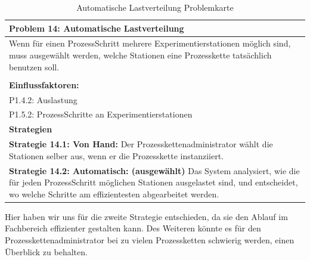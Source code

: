 \documentclass[enabledeprecatedfontcommands,fontsize=12pt,paper=a4,twoside]{scrartcl}
\begin{document}
\begin{table}[H]
    \centering
    \begin{tabular}{|p{15cm}|}
    \hline
          \textbf{Problem 14:} Automatische Lastverteilung
          \\ \hline
         Wenn für einen ProzessSchritt mehrere Experimentierstationen möglich sind, muss ausgewählt werden, welche Stationen eine Prozesskette tatsächlich benutzen soll. \\
        \\  \hline
        \textbf{Einflussfaktoren: } \\
	P1.4.2: Auslastung \\
	P1.5.2: ProzessSchritte an Experimentierstationen\\
        \hline
        \textbf{Strategien} \\
          {}          
           \label{strategie:14.1}     
        \textbf{Strategie 14.1: Von Hand:} Der Prozesskettenadministrator wählt die Stationen selber aus, wenn er die Prozesskette instanziiert. \\   
        {}          
           \label{strategie:14.2}        
	\textbf{Strategie 14.2: Automatisch: (ausgewählt)} Das System analysiert, wie die für jeden ProzessSchritt möglichen Stationen ausgelastet sind, und entscheidet, wo welche Schritte am effizientesten abgearbeitet werden.\\ \hline
    \end{tabular}
    \caption{Automatische Lastverteilung Problemkarte}
    \label{tab:ProblemKarte14}
\end{table}

Hier haben wir uns für die zweite Strategie entschieden, da sie den Ablauf im Fachbereich effizienter gestalten kann. Des Weiteren könnte es für den Prozesskettenadministrator bei zu vielen Prozessketten schwierig werden, einen Überblick zu behalten. \\
\end{document}
